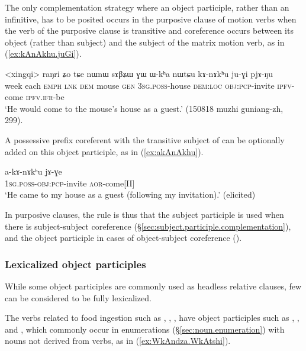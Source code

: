 The only complementation strategy where an object participle, rather than an infinitive, has to be posited occurs in the purposive clause of  motion verbs when the verb of the purposive clause is transitive and coreference occurs between its object (rather than subject) and the subject of the matrix motion verb, as  in (\ref{ex:kAnAkhu.juGi}).

\begin{exe}
\ex \label{ex:kAnAkhu.juGi}
\gll <xingqi> raŋri ʑo tɕe nɯnɯ sɤβʑɯ ɣɯ ɯ-kʰa nɯtɕu kɤ-nɤkʰu ju-ɣi pjɤ-ŋu  \\
week each \textsc{emph} \textsc{lnk} \textsc{dem} mouse \textsc{gen} \textsc{3sg}.\textsc{poss}-house \textsc{dem}:\textsc{loc} \textsc{obj}:\textsc{pcp}-invite \textsc{ipfv}-come \textsc{ipfv}.\textsc{ifr}-be \\
\glt `He would come to the mouse's house as a guest.' (150818 muzhi guniang-zh, 299).
\end{exe}

 A possessive prefix coreferent with the transitive subject of  can be optionally added on this object participle, as in (\ref{ex:akAnAkhu}).

\begin{exe}
\ex \label{ex:akAnAkhu}
\gll a-kɤ-nɤkʰu jɤ-ɣe  \\
 \textsc{1sg}.\textsc{poss}-\textsc{obj}:\textsc{pcp}-invite \textsc{aor}-come[II] \\
\glt `He came to my house as a guest (following my invitation).' (elicited)
\end{exe}

In purposive clauses, the rule is thus that the subject participle is used when there is subject-subject coreference (§\ref{sec:subject.participle.complementation}), and the object participle in cases of object-subject coreference  (\citealt[248]{jacques16complementation}). 
\subsubsection{Lexicalized object participles} \label{sec:lexicalized.object.participle}
While some object participles are commonly used as headless relative clauses, few can be considered to be fully lexicalized. 

The verbs related to food ingestion such as , , ,  have object participles such as , ,  and , which commonly occur in enumerations (§\ref{sec:noun.enumeration}) with nouns not derived from verbs, as in (\ref{ex:WkAndza.WkAtshi}).  

